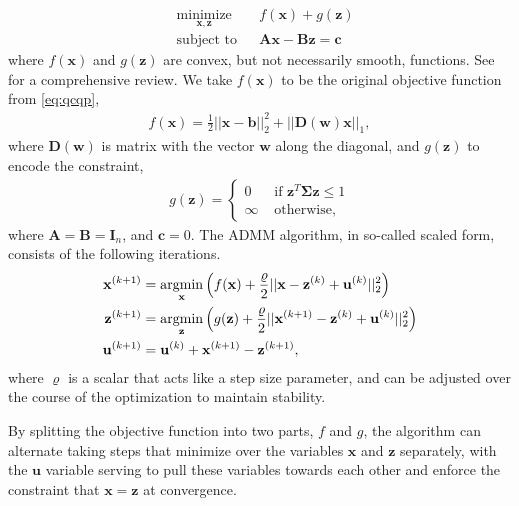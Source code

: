 \documentclass[aip, jcp, reprint, nolinenumbers, twocolumn, nobalancelastpage, nofootinbib]{revtex4-1}
\newcommand{\argmin}{\operatornamewithlimits{argmin}}
\begin{document}
\begin{equation}
\begin{aligned}
& \underset{\mathbf{x},\mathbf{z}}{\text{minimize}}
& & f(\mathbf{x}) + g(\mathbf{z}) \\
& \text{subject to}
& & \mathbf{A}\mathbf{x} - \mathbf{B}\mathbf{z} = \mathbf{c}
\end{aligned}
\end{equation}
where $f(\mathbf{x})$ and $g(\mathbf{z})$ are convex, but not necessarily smooth, functions. See \citet{boyd2011distributed} for a comprehensive review. We take $f(\mathbf{x})$ to be the original objective function from \cref{eq:qcqp},
\begin{align}
f(\mathbf{x})= \frac{1}{2}||\mathbf{x}-\mathbf{b}||_2^2 + ||\mathbf{D}(\mathbf{w})\mathbf{x}||_1,
\end{align}
where $\mathbf{D}(\mathbf{w})$ is matrix with the vector $\mathbf{w}$ along the diagonal, and $g(\mathbf{z})$ to encode the constraint,
\begin{align}
g(\mathbf{z}) = \begin{cases} 0 &\text{ if } \mathbf{z}^T\mathbf{\Sigma} \mathbf{z} \leq 1 \\ \infty &\text{ otherwise,} \end{cases}
\end{align}
where $\mathbf{A}=\mathbf{B}=\mathbf{I}_n$, and $\mathbf{c}=0$. The ADMM algorithm, in so-called scaled form, consists of the following iterations.
\begin{align}
\mathbf{x}^{(k+1)} &= \argmin_\mathbf{x} \left(f(\mathbf{x}) + \frac{\varrho}{2}||\mathbf{x} - \mathbf{z}^{(k)} + \mathbf{u}^{(k)}||^2_2 \right) \label{eq:xopt}\\
\mathbf{z}^{(k+1)} &= \argmin_\mathbf{z} \left(g(\mathbf{z}) + \frac{\varrho}{2}||\mathbf{x}^{(k+1)} - \mathbf{z}^{(k)} + \mathbf{u}^{(k)}||^2_2 \right) \label{eq:zopt} \\
\mathbf{u}^{(k+1)} &= \mathbf{u}^{(k)} + \mathbf{x}^{(k+1)} - \mathbf{z}^{(k+1)}, \nonumber
\end{align}
where $\varrho$ is a scalar that acts like a step size parameter, and can be adjusted over the course of the optimization to maintain stability.

By splitting the objective function into two parts, $f$ and $g$, the algorithm can alternate taking steps that minimize over the variables $\mathbf{x}$ and $\mathbf{z}$ separately, with the $\mathbf{u}$ variable serving to pull these variables towards each other and enforce the constraint that $\mathbf{x}=\mathbf{z}$ at convergence.
\end{document}
